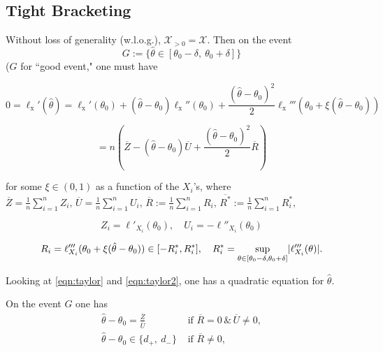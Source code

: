 \medskip

\subsection{Tight Bracketing}

Without loss of generality (w.l.o.g.), $\mathcal{X}_{>0}=\mathcal{X}$. Then on the event
\begin{equation}\label{eqn:goodevent}
	G:=\{\hat{\theta}\in[\theta_{0}-\delta,\ \theta_{0}+\delta]\}
\end{equation}
($G$ for ``good event," one must have

\begin{equation}\label{eqn:taylor}
	0 =\ell_{\mathrm{x}}'(\displaystyle \hat{\theta})=\ell_{\mathrm{x}}'(\theta_{0})+(\hat{\theta}-\theta_{0})\ell_{\mathrm{x}}''(\theta_{0})+\frac{(\hat{\theta}-\theta_{0})^{2}}{2}\ell_{\mathrm{x}}'''(\theta_{0}+\xi(\hat{\theta}-\theta_{0}))
\end{equation}

\begin{equation}\label{eqn:taylor2}
	=n(\overline{Z}-(\hat{\theta}-\theta_{0})\overline{U}+\frac{(\hat{\theta}-\theta_{0})^{2}}{2}\overline{R})
\end{equation}

for some $\xi\in (0,1)$ as a function of the $X_i$'s, where $\overline{Z}=\frac{1}{n}\sum_{i=1}^n Z_i,\, \overline{U}=\frac{1}{n}\sum_{i=1}^{n}U_{i},\, \overline{R}:=\frac{1}{n}\sum_{i=1}^{n}R_{i},\,
\overline{R^{*}}:=\frac{1}{n}\sum_{i=1}^{n}R_{i}^{*},$

\begin{equation}\label{eqn:Z}
	Z_i = \ell'_{X_i}(\theta_0),\quad U_i=-\ell''_{X_i}(\theta_0)
\end{equation}

\begin{equation}\label{eqn:R}
	R_i = \ell'''_{X_i}(\theta_0 + \xi(\hat{\theta}-\theta_0))\in [-R_i^{*},R_i^{*}], \quad R_i^{*}=\sup_{\theta\in [\theta_0-\delta,\theta_0+\delta]} \lvert\ell'''_{X_i}(\theta)\rvert.
\end{equation}

Looking at \eqref{eqn:taylor} and \eqref{eqn:taylor2}, one has a quadratic equation for $\hat{\theta}$.

On the event $G$ one has
\begin{align*}
	\hat{\theta}-\theta_{0}=\frac{\overline{Z}}{\overline{U}} &\textrm{ if } \overline{R}=0\, \&\, \overline{U}\neq 0, \\
	\hat{\theta}-\theta_{0}\in\{d_{+},\ d_{-}\} &\textrm{ if } \overline{R}\neq 0,
\end{align*}

